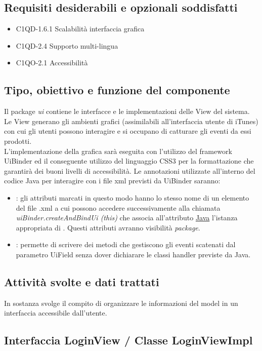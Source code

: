 \subsection*{Requisiti desiderabili e opzionali soddisfatti}
\begin{itemize}
    \item C1QD-1.6.1 Scalabilit\`a interfaccia grafica
    \item C1QD-2.4 Supporto multi-lingua
    \item C1QO-2.1 Accessibilit\`a
\end{itemize}
\subsection*{Tipo, obiettivo e funzione del componente}
Il package \emph{ui} contiene le interfacce e le implementazioni delle View del
sistema. Le View generano gli ambienti grafici (assimilabili all'interfaccia
utente di iTunes) con cui gli utenti possono interagire e si occupano di
catturare gli eventi da essi prodotti. \\
L'implementazione della grafica sar\`a eseguita con l'utilizzo del framework
UiBinder ed il conseguente utilizzo del linguaggio CSS3 per la formattazione
che garantir\`a dei buoni livelli di accessibilit\`a.
Le annotazioni utilizzate all'interno del codice Java per interagire con i file
xml previsti da UiBinder saranno:
\begin{itemize}
  \item {}: gli attributi marcati in questo modo hanno lo stesso nome
  di un elemento del file .xml a cui possono accedere successivamente alla
  chiamata \emph{uiBinder.createAndBindUi (this)} che associa all'attributo
  \underline{Java} l'istanza appropriata di . Questi attributi
  avranno visibilit\`a \emph{package}.
  \item {}: permette di scrivere dei metodi
  che gestiscono gli eventi scatenati dal parametro UiField senza
  dover dichiarare le classi handler previste da Java.
\end{itemize}
\subsection*{Attivit\`a svolte e dati trattati}
In sostanza svolge il compito di organizzare le informazioni del model in un
interfaccia accessibile dall'utente.


\subsection{Interfaccia LoginView / Classe LoginViewImpl}
